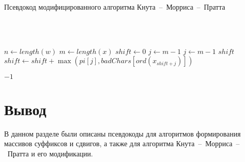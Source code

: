 \begin{algorithm}[H]
	\caption{Псевдокод модифицированного алгоритма  Кнута~--~Морриса~--~Пратта}
	\label{alg:alg_04}
	\\
	 \\
	\begin{algorithmic}[1]
		\State $n \gets length(w)$
		\State $m \gets length(x)$
		\State $shift \gets 0$
			\State $j \gets m - 1$
				\State $j \gets m - 1$
			\EndWhile
				\Return $shift$
			\Else
				\State $shift \gets shift + \max(pi[j], badChars[ord(x_{shift + j})])$
			\EndIf
		\EndWhile
		
		\Return $-1$
		\EndFunction
	\end{algorithmic}
\end{algorithm}

\section*{Вывод}
В данном разделе были описаны псевдокоды для алгоритмов формирования массивов суффиксов и сдвигов, а также для алгоритма Кнута~--~Морриса~--~Пратта и его модификации. 